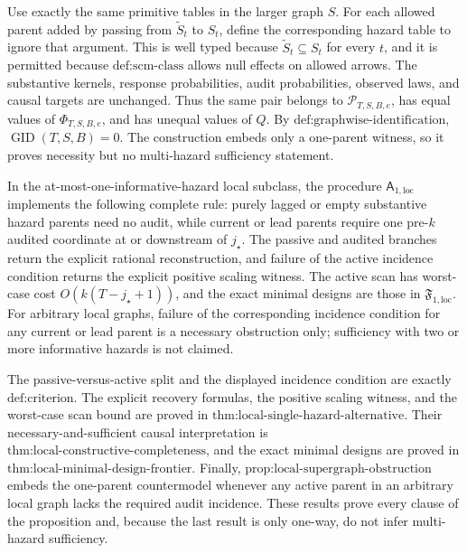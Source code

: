 Use exactly the same primitive tables in the larger graph \(S\).  For each allowed parent added by passing from \(\widetilde S_t\) to \(S_t\), define the corresponding hazard table to ignore that argument.  This is well typed because
\(\widetilde S_t\subseteq S_t\) for every \(t\), and it is permitted because
\(\text{def:scm-class}\) allows null effects on allowed arrows.  The substantive kernels, response probabilities, audit probabilities, observed laws, and causal targets are unchanged.  Thus the same pair belongs to
\(\mathcal P_{T,S,B,e}\), has equal values of \(\Phi_{T,S,B,e}\), and has unequal values of \(Q\).  By \(\text{def:graphwise-identification}\),
\(\operatorname{GID}(T,S,B)=0\).  The construction embeds only a one-parent witness, so it proves necessity but no multi-hazard sufficiency statement.

In the at-most-one-informative-hazard local subclass, the procedure
\(\mathsf A_{1,\mathrm{loc}}\) implements the following complete rule: purely lagged or empty substantive hazard parents need no audit, while current or lead parents require one pre-\(k\) audited coordinate at or downstream of
\(j_\star\).  The passive and audited branches return the explicit rational reconstruction, and failure of the active incidence condition returns the explicit positive scaling witness.  The active scan has worst-case cost
\(O(k(T-j_\star+1))\), and the exact minimal designs are those in
\(\mathfrak F_{1,\mathrm{loc}}\).  For arbitrary local graphs, failure of the corresponding incidence condition for any current or lead parent is a necessary obstruction only; sufficiency with two or more informative hazards is not claimed.

The passive-versus-active split and the displayed incidence condition are exactly \(\text{def:criterion}\).  The explicit recovery formulas, the positive scaling witness, and the worst-case scan bound are proved in
\(\text{thm:local-single-hazard-alternative}\).  Their necessary-and-sufficient causal interpretation is
\(\text{thm:local-constructive-completeness}\), and the exact minimal designs are proved in \(\text{thm:local-minimal-design-frontier}\).  Finally,
\(\text{prop:local-supergraph-obstruction}\) embeds the one-parent countermodel whenever any active parent in an arbitrary local graph lacks the required audit incidence.  These results prove every clause of the proposition and, because the last result is only one-way, do not infer multi-hazard sufficiency.

